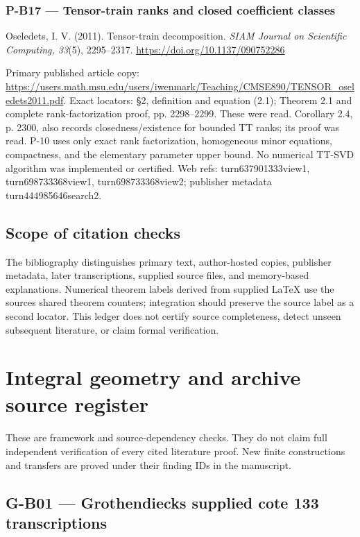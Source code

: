 \documentclass[11pt,a4paper]{article}
\theoremstyle{definition}\newtheorem{definition}{Definition}
\begin{document}
\subsubsection{P-B17 --- Tensor-train ranks and closed coefficient
classes}\label{p-b17--tensor-train-ranks-and-closed-coefficient-classes}

Oseledets, I. V. (2011). Tensor-train decomposition. \emph{SIAM Journal
on Scientific Computing, 33}(5), 2295--2317.
\url{https://doi.org/10.1137/090752286}

Primary published article copy:
\url{https://users.math.msu.edu/users/iwenmark/Teaching/CMSE890/TENSOR_oseledets2011.pdf}.
Exact locators: §2, definition and equation (2.1); Theorem 2.1 and
complete rank-factorization proof, pp. 2298--2299. These were read.
Corollary 2.4, p. 2300, also records closedness/existence for bounded TT
ranks; its proof was read. P-10 uses only exact rank factorization,
homogeneous minor equations, compactness, and the elementary parameter
upper bound. No numerical TT-SVD algorithm was implemented or certified.
Web refs: turn637901333view1, turn698733368view1, turn698733368view2;
publisher metadata turn444985646search2.

\subsection{Scope of citation checks}\label{scope-of-citation-checks}

The bibliography distinguishes primary text, author-hosted copies,
publisher metadata, later transcriptions, supplied source files, and
memory-based explanations. Numerical theorem labels derived from
supplied LaTeX use the source\textquotesingle s shared theorem counters;
integration should preserve the source label as a second locator. This
ledger does not certify source completeness, detect unseen subsequent
literature, or claim formal verification.
\section{Integral geometry and archive source
register}\label{integral-geometry-and-archive-source-register}

These are framework and source-dependency checks. They do not claim full
independent verification of every cited literature proof. New finite
constructions and transfers are proved under their finding IDs in the
manuscript.

\subsection{G-B01 --- Grothendieck\textquotesingle s supplied cote 133
transcriptions}\label{g-b01--grothendiecks-supplied-cote-133-transcriptions}
\end{document}
